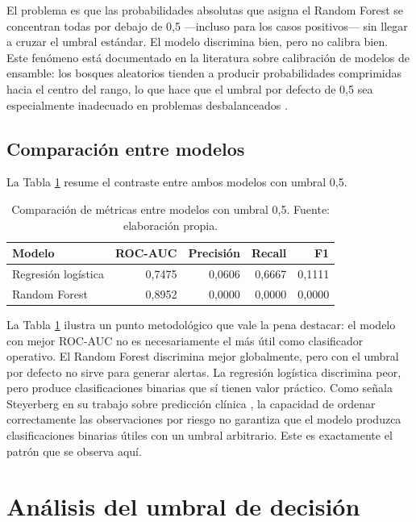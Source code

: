 \documentclass[12pt, a4paper, oneside]{report}
\begin{document}
El problema es que las probabilidades absolutas que asigna el Random Forest se concentran todas por debajo de 0,5 —incluso para los casos positivos— sin llegar a cruzar el umbral estándar. El modelo discrimina bien, pero no calibra bien. Este fenómeno está documentado en la literatura sobre calibración de modelos de ensamble: los bosques aleatorios tienden a producir probabilidades comprimidas hacia el centro del rango, lo que hace que el umbral por defecto de 0,5 sea especialmente inadecuado en problemas desbalanceados \parencite{niculescu2005predicting}.

\subsection{Comparación entre modelos}

La Tabla \ref{tab:comparacion} resume el contraste entre ambos modelos con umbral 0,5.

\begin{table}[h]
\centering
\begin{tabular}{lrrrr}
\hline
\textbf{Modelo} & \textbf{ROC-AUC} & \textbf{Precisión} & \textbf{Recall} & \textbf{F1} \\
\hline
Regresión logística & 0,7475 & 0,0606 & 0,6667 & 0,1111 \\
Random Forest & 0,8952 & 0,0000 & 0,0000 & 0,0000 \\
\hline
\end{tabular}
\caption{Comparación de métricas entre modelos con umbral 0,5. Fuente: elaboración propia.}
\label{tab:comparacion}
\end{table}

La Tabla \ref{tab:comparacion} ilustra un punto metodológico que vale la pena destacar: el modelo con mejor ROC-AUC no es necesariamente el más útil como clasificador operativo. El Random Forest discrimina mejor globalmente, pero con el umbral por defecto no sirve para generar alertas. La regresión logística discrimina peor, pero produce clasificaciones binarias que sí tienen valor práctico. Como señala Steyerberg en su trabajo sobre predicción clínica \parencite{steyerberg2014validation}, la capacidad de ordenar correctamente las observaciones por riesgo no garantiza que el modelo produzca clasificaciones binarias útiles con un umbral arbitrario. Este es exactamente el patrón que se observa aquí.

\section{Análisis del umbral de decisión}
\end{document}
